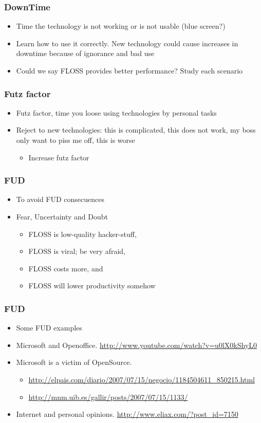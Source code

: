\documentclass{beamer}
\begin{document}
\begin{frame}
\frametitle{DownTime}
\begin{itemize}
\item Time the technology is not working or is not usable (blue screen?)
\item Learn how to use it correctly. New technology could cause increases in downtime because of ignorance and bad use
\item Could we say FLOSS provides better performance? Study each scenario
\end{itemize}
\end{frame}

\begin{frame}
\frametitle{Futz factor}
\begin{itemize}
\item Futz factor, time you loose using technologies by personal tasks
\item Reject to new technologies: this is complicated, this does not work, my boss only want to piss me off, this is worse
\begin{itemize}
 \item   Increase futz factor
\end {itemize}
\end{itemize}
\end{frame}


\begin{frame}
\frametitle{FUD}
\begin{itemize}
\item To avoid FUD consecuences
\item Fear, Uncertainty and Doubt
\begin{itemize}
 \item   FLOSS is low-quality hacker-stuff,
 \item   FLOSS is viral; be very afraid,
 \item   FLOSS costs more, and
 \item   FLOSS will lower productivity somehow 
\end {itemize}
\end{itemize}
\end{frame}

\begin{frame}
\frametitle{FUD}
\begin{itemize}
\item Some FUD examples
\item Microsoft and Openoffice. \url{http://www.youtube.com/watch?v=u0lX0kShyL0}
\item Microsoft is a victim of OpenSource.
\begin{itemize}
 \item \url{http://elpais.com/diario/2007/07/15/negocio/1184504611_850215.html}
 \item \url{http://mnm.uib.es/gallir/posts/2007/07/15/1133/}
\end{itemize}
\item Internet and personal opinions. \url{http://www.eliax.com/?post_id=7150}
\end{itemize}
\end{frame}
\end{document}
